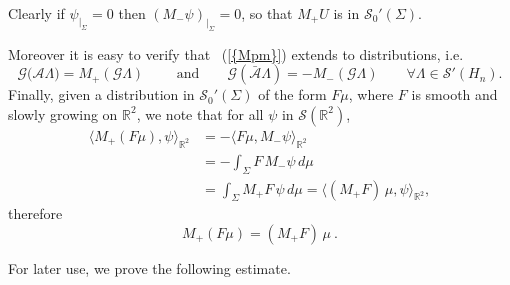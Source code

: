 \documentclass[12pt,a4paper]{amsart}
\theoremstyle{plain}
\theoremstyle{definition}
\numberwithin{equation}{section}
\begin{document}
Clearly if $\psi_{|_{\Sigma}}=0$ then $(M_-\psi)_{|_{\Sigma}}=0$, so that $M_+U$ is in ${\mathcal S}_0'({\Sigma})$.

Moreover it is easy to verify that {~(\ref{{Mpm}})} extends to distributions, i.e.
\begin{equation}\label{emmepiu}
 {\mathcal G}({{{\mathcal A}\Lambda)}}=M_+ ( {\mathcal G}{ \Lambda })
 \qquad{\text{ and}}\qquad  {\mathcal G}({{\bar{\mathcal A} \Lambda}})=- M_- ( {\mathcal G}{ \Lambda})
 \qquad \forall \Lambda \in {\mathcal S}'({{H_{n}}})
 .
\end{equation}
  Finally, given a distribution in ${\mathcal S}_0'({\Sigma})$
of the form $F\mu$, where $F$ is smooth and slowly growing
on ${\mathbb R}^2$,
we note that for all $\psi$ in ${\mathcal S}({\mathbb R}^2)$,
\begin{align*}
{\langle {M_+(F\mu)},{\psi} \rangle_{{\mathbb R}^2}}
&=
-{\langle {F\mu},{M_- \psi} \rangle_{{\mathbb R}^2}}
\\
&=-\int_{\Sigma} F\, M_- \psi\, d\mu
\\
&=\int_{\Sigma} M_+ F\, \psi\, d\mu
={\langle {(M_+F)\,\mu},{\psi} \rangle_{{\mathbb R}^2}},
\end{align*}
therefore
\begin{equation}
\label{emmepiuF}
M_+(F\mu)=(M_+ F)\,\mu\ .
\end{equation}
 
For later use, we prove the following estimate.
\end{document}
